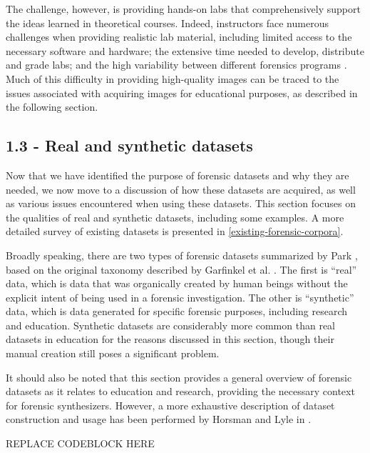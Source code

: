 The challenge, however, is providing hands-on labs that comprehensively
support the ideas learned in theoretical courses. Indeed, instructors
face numerous challenges when providing realistic lab material,
including limited access to the necessary software and hardware; the
extensive time needed to develop, distribute and grade labs; and the
high variability between different forensics programs
\cite{adelsteinAutomaticallyCreatingRealistic2005,guptaDigitalForensicsLab2022,lawrenceFrameworkDesignWebbased2009}.
Much of this difficulty in providing high-quality images can be traced
to the issues associated with acquiring images for educational purposes,
as described in the following section.

\subsection{1.3 - Real and synthetic
datasets}\label{real-and-synthetic-datasets}

Now that we have identified the purpose of forensic datasets and why
they are needed, we now move to a discussion of how these datasets are
acquired, as well as various issues encountered when using these
datasets. This section focuses on the qualities of real and synthetic
datasets, including some examples. A more detailed survey of existing
datasets is presented in \ref{existing-forensic-corpora}.

Broadly speaking, there are two types of forensic datasets summarized by
Park \cite{parkTREDEVMPOPCultivating2018}, based on the original
taxonomy described by Garfinkel et al.
\cite{garfinkelBringingScienceDigital2009}. The first is ``real''
data, which is data that was organically created by human beings without
the explicit intent of being used in a forensic investigation. The other
is ``synthetic'' data, which is data generated for specific forensic
purposes, including research and education. Synthetic datasets are
considerably more common than real datasets in education for the reasons
discussed in this section, though their manual creation still poses a
significant problem.

It should also be noted that this section provides a general overview of
forensic datasets as it relates to education and research, providing the
necessary context for forensic synthesizers. However, a more exhaustive
description of dataset construction and usage has been performed by
Horsman and Lyle in \cite{horsmanDatasetConstructionChallenges2021}.

REPLACE CODEBLOCK HERE

